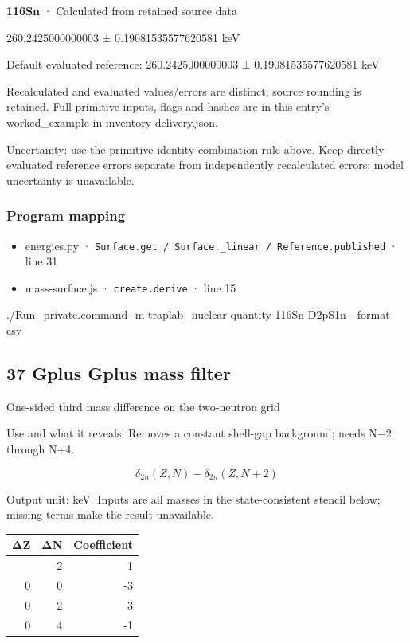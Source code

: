 \documentclass[
  11pt,
  letterpaper,
]{article}
\newenvironment{Shaded}{}{}
\newcommand{\AttributeTok}[1]{\textcolor[rgb]{0.49,0.56,0.16}{#1}}
\newcommand{\ExtensionTok}[1]{#1}
\newcommand{\NormalTok}[1]{#1}
\providecommand{\tightlist}{%
  \setlength{\itemsep}{0pt}\setlength{\parskip}{0pt}}
\begin{document}
\textbf{116Sn} · Calculated from retained source data

260.2425000000003 ± 0.19081535577620581 keV

Default evaluated reference: 260.2425000000003 ± 0.19081535577620581 keV

Recalculated and evaluated values/errors are distinct; source rounding
is retained. Full primitive inputs, flags and hashes are in this entry's
worked\_example in inventory-delivery.json.

Uncertainty: use the primitive-identity combination rule above. Keep
directly evaluated reference errors separate from independently
recalculated errors; model uncertainty is unavailable.

\subsubsection{Program mapping}\label{program-mapping-35}

\begin{itemize}
\tightlist
\item
  energies.py ·
  \texttt{Surface.get\ /\ Surface.\_linear\ /\ Reference.published} ·
  line 31
\item
  mass-surface.js · \texttt{create.derive} · line 15
\end{itemize}

\begin{Shaded}
\begin{Highlighting}[]
\ExtensionTok{./Run\_private.command} \AttributeTok{{-}m}\NormalTok{ traplab\_nuclear quantity 116Sn D2pS1n }\AttributeTok{{-}{-}format}\NormalTok{ csv}
\end{Highlighting}
\end{Shaded}

\subsection{37 Gplus Gplus mass filter}\label{gplus-gplus-mass-filter}

One-sided third mass difference on the two-neutron grid

Use and what it reveals: Removes a constant shell-gap background; needs
N−2 through N+4.

\[
\delta_{2n}(Z,N)-\delta_{2n}(Z,N+2)
\]

Output unit: keV. Inputs are all masses in the state-consistent stencil
below; missing terms make the result unavailable.

\begin{longtable}[]{@{}rrr@{}}
\toprule\noalign{}
ΔZ & ΔN & Coefficient \\
\midrule\noalign{}
\endhead
\bottomrule\noalign{}
\endlastfoot
0 & -2 & 1 \\
0 & 0 & -3 \\
0 & 2 & 3 \\
0 & 4 & -1 \\
\end{longtable}
\end{document}
